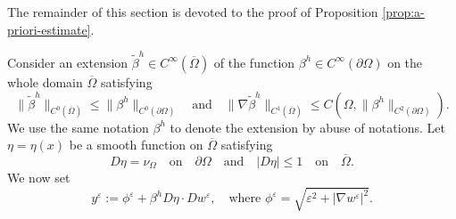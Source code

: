 \documentclass[11pt]{article}
\numberwithin{equation}{section}
\newcommand{\fix}[1]{\textcolor{red}{#1}}
\def\leq{\leqslant}
\begin{document}

The remainder of this section is devoted to the proof of Proposition \ref{prop:a-priori-estimate}.

\medskip

Consider an extension $\widetilde{\beta}^h\in C^\infty(\overline{\Omega})$ of the function $\beta^h\in C^\infty(\partial\Omega)$ on the whole domain $\overline{\Omega}$ satisfying 
$$
\|\widetilde{\beta}^h\|_{C^0(\overline{\Omega})} \leq \|\beta^h\|_{C^0(\partial\Omega)}\quad\text{and}\quad\|\nabla\widetilde{\beta}^h\|_{C^1(\overline{\Omega})}\leq C(\Omega,\|\beta^h\|_{C^2(\partial\Omega)}).
$$
We use the same notation $\beta^h$ to denote the extension by abuse of notations. Let $\eta=\eta(x)$ be a smooth function on $\overline{\Omega}$ satisfying
\[
D\eta = \nu_{\Omega}\quad\text{on}\quad\partial\Omega\quad\text{and}\quad|D\eta|\leq1\quad\text{on}\quad\overline{\Omega}.
\]
We now set
\[
y^\varepsilon := \phi^\varepsilon + \beta^h D\eta \cdot Dw^{\varepsilon}, \quad \text{where } \phi^\varepsilon = \sqrt{\varepsilon^2 + |\nabla w^\varepsilon|^2}.
\]
\end{document}
